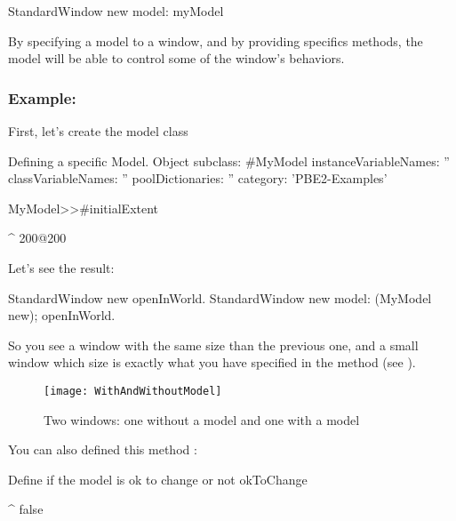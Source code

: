 \documentclass[a4paper,10pt,twoside]{book}
\begin{document}
\begin{code}{}
StandardWindow new model: myModel
\end{code}

By specifying a model to a window, and by providing specifics methods, the model will be able to control some of the window's behaviors.

\subsubsection{Example:}

First, let's create the model class

\begin{classdef}{Defining a specific Model.}
Object subclass: #MyModel
	instanceVariableNames: ''
	classVariableNames: ''
	poolDictionaries: ''
	category: 'PBE2-Examples'

MyModel>>#initialExtent

	^ 200@200
\end{classdef}

Let's see the result:

\begin{code}{}
StandardWindow new openInWorld.
StandardWindow new model: (MyModel new); openInWorld.
\end{code}

So you see a window with the same size than the previous one, and a small window which size is exactly what you have specified in the method  (see ).

\begin{figure}[ht]
\begin{center}
	\texttt{[image: WithAndWithoutModel]}
	\caption{Two windows: one without a model and one with a model}
\end{center}
\end{figure}

You can also defined this method :

\begin{method}{Define if the model is ok to change or not}
okToChange

	^ false
\end{method}
\end{document}
